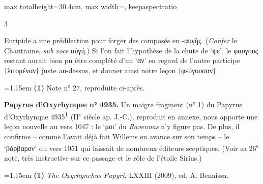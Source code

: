\documentclass[11pt,twoside]{book}
\newcommand{\currHeadLE}{}
\newcommand{\currHeadRE}{}
\newcommand{\currHeadLO}{}
\newcommand{\italique}[1]{\textit{#1}}
\newcommand{\nieme}[1]{#1\textsuperscript{e}}
\newcommand{\R}{\textbf{R}}
\newcommand{\marqueur}[1]{\textsuperscript{\color{rubricRed}\textbf{#1}}}
\begin{document}
\begin{adjustbox}{max totalheight=30.4cm, max width=\textwidth, keepaspectratio}
\begin{minipage}{\textwidth}
{\begin{multicols}{3}
\par\vspace{1.5pt}
\noindent Euripide a une prédilection pour forger des composés en -αυγής. (\italique{Confer} le Chantraine, \italique{sub voce} αὐγή.)  Si l'on fait l'hypothèse de la chute de `ψε', le φαυγους restant aurait bien pu être complété d'un `αν' en regard de l'autre participe †λιτομέναν† juste au-dessus, et donner ainsi notre leçon †φεύγουσαν†.
\par\vspace{1.5pt}
\par\vspace{1.2pt}\par\nopagebreak\vspace{1pt}\noindent\hangindent=1.15em {\color{sepiaNote}\textbf{(1)}} Note n° 27, reproduite ci-après.
\par\vspace{1.5pt}
 \textbf{Papyrus d'Oxyrhynque n° 4935.} Un maigre fragment (n° 1) du Papyrus d'Oxyrhynque 4935\marqueur{1} (\nieme{II} siècle ap. J.-C.), reproduit en annexe, nous apporte une leçon nouvelle au vers 1047 : le `μοι' du \italique{Ravennas} n'y figure pas. De plus, il confirme -- comme l'avait déjà fait Willems en avance sur son temps -- le `βάρβαρον' du vers 1051 qui laissait de nombreux éditeurs sceptiques. (Voir sa \nieme{26} note, très instructive sur ce passage et le rôle de l'étoile Sirius.)
\par\vspace{1.5pt}
\par\vspace{1.2pt}\par\nopagebreak\vspace{1pt}\noindent\hangindent=1.15em {\color{sepiaNote}\textbf{(1)}} \italique{The Oxyrhynchus Papyri}, LXXIII (2009), ed. A. Benaissa.
\par\end{multicols}}
\end{minipage}\end{adjustbox}
\clearpage\ifodd\value{page}\hbox{}\newpage\fi
\renewcommand{\currHeadLE}{ΑΡΙΣΤΟΦΑΝΟΥΣ ΘΕΣΜΟΦΟΡΙΑΖΟΥΣΑΙ · CODEX RAVENNAS 429 (\R)}
\renewcommand{\currHeadRE}{Folio f. 175r (Classense 177r) · vv. 1044–1081}
\renewcommand{\currHeadLO}{FAC-SIMILÉ DU CODEX RAVENNAS 429 (\R) · f. 175r (Classense 177r)}
\end{document}
